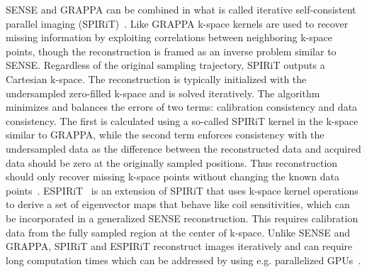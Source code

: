SENSE and GRAPPA can be combined in what is called iterative self-consistent parallel imaging (SPIRiT)~\cite{SPIRiT}. Like GRAPPA k-space kernels are used to recover missing information by exploiting correlations between neighboring k-space points, though the reconstruction is framed as an inverse problem similar to SENSE. Regardless of the original sampling trajectory, SPIRiT outputs a Cartesian k-space. The reconstruction is typically initialized with the undersampled zero-filled k-space and is solved iteratively. 
The algorithm 
minimizes and balances the errors of two terms: calibration consistency and data consistency. The first is calculated using a so-called SPIRiT kernel in the k-space similar to GRAPPA, while the second term enforces consistency with the undersampled data as the difference between the reconstructed data and acquired data should be zero at the originally sampled positions. Thus reconstruction should only recover missing k-space points without changing the known data points~\cite{AdvancesPI}. %
ESPIRiT~\cite{ESPIRiT} is an extension of SPIRiT that uses k-space kernel operations to derive a set of eigenvector maps that behave like coil sensitivities, which can be incorporated in a generalized SENSE reconstruction. This requires calibration data from the fully sampled region at the center of k-space. 
Unlike SENSE and GRAPPA, SPIRiT and ESPIRiT reconstruct images iteratively and can require long computation times which can be addressed by using e.g. parallelized GPUs~\cite{AdvancesPI}.


